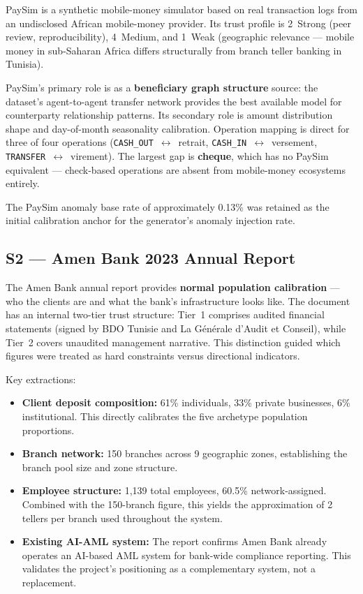PaySim is a synthetic mobile-money simulator based on real transaction logs from
an undisclosed African mobile-money provider. Its trust profile is 2~Strong (peer
review, reproducibility), 4~Medium, and 1~Weak (geographic relevance --- mobile
money in sub-Saharan Africa differs structurally from branch teller banking in
Tunisia).

PaySim's primary role is as a \textbf{beneficiary graph structure} source: the
dataset's agent-to-agent transfer network provides the best available model for
counterparty relationship patterns. Its secondary role is amount distribution
shape and day-of-month seasonality calibration. Operation mapping is direct for
three of four operations (\texttt{CASH\_OUT}~$\leftrightarrow$~retrait,
\texttt{CASH\_IN}~$\leftrightarrow$~versement,
\texttt{TRANSFER}~$\leftrightarrow$~virement). The largest gap is
\textbf{cheque}, which has no PaySim equivalent --- check-based operations are
absent from mobile-money ecosystems entirely.

The PaySim anomaly base rate of approximately 0.13\% was retained as the initial
calibration anchor for the generator's anomaly injection rate.

\subsection{S2 --- Amen Bank 2023 Annual Report}

The Amen Bank annual report provides \textbf{normal population calibration} ---
who the clients are and what the bank's infrastructure looks like. The document
has an internal two-tier trust structure: Tier~1 comprises audited financial
statements (signed by BDO Tunisie and La Générale d'Audit et Conseil), while
Tier~2 covers unaudited management narrative. This distinction guided which
figures were treated as hard constraints versus directional indicators.

Key extractions:

\begin{itemize}[leftmargin=2cm]
    \item \textbf{Client deposit composition:} 61\% individuals, 33\% private
          businesses, 6\% institutional. This directly calibrates the five
          archetype population proportions.
    \item \textbf{Branch network:} 150 branches across 9 geographic zones,
          establishing the branch pool size and zone structure.
    \item \textbf{Employee structure:} 1,139 total employees, 60.5\%
          network-assigned. Combined with the 150-branch figure, this yields
          the approximation of 2 tellers per branch used throughout the system.
    \item \textbf{Existing AI-AML system:} The report confirms Amen Bank already
          operates an AI-based AML system for bank-wide compliance reporting. This
          validates the project's positioning as a complementary system, not a
          replacement.
\end{itemize}

